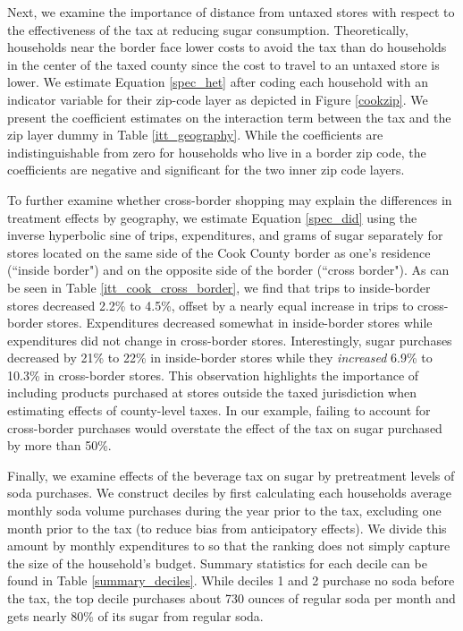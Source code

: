 \documentclass[12pt]{article}
\begin{document}
Next, we examine the importance of distance from untaxed stores with respect to the effectiveness of the tax at reducing sugar consumption. Theoretically, households near the border face lower costs to avoid the tax than do households in the center of the taxed county since the cost to travel to an untaxed store is lower. We estimate Equation \ref{spec_het} after coding each household with an indicator variable for their zip-code layer as depicted in Figure \ref{cookzip}. We present the coefficient estimates on the interaction term between the tax and the zip layer dummy in Table \ref{itt_geography}. While the coefficients are indistinguishable from zero for households who live in a border zip code, the coefficients are negative and significant for the two inner zip code layers.

To further examine whether cross-border shopping may explain the differences in treatment effects by geography, we estimate Equation \ref{spec_did} using the inverse hyperbolic sine of trips, expenditures, and grams of sugar separately for stores located on the same side of the Cook County border as one's residence (``inside border") and on the opposite side of the border (``cross border"). As can be seen in Table \ref{itt_cook_cross_border}, we find that trips to inside-border stores decreased 2.2\% to 4.5\%, offset by a nearly equal increase in trips to cross-border stores. Expenditures decreased somewhat in inside-border stores while expenditures did not change in cross-border stores. Interestingly, sugar purchases decreased by 21\% to 22\% in inside-border stores while they \textit{increased} 6.9\% to 10.3\% in cross-border stores. This observation highlights the importance of including products purchased at stores outside the taxed jurisdiction when estimating effects of county-level taxes. In our example, failing to account for cross-border purchases would overstate the effect of the tax on sugar purchased by more than 50\%.

Finally, we examine effects of the beverage tax on sugar by pretreatment levels of soda purchases. We construct deciles by first calculating each households average monthly soda volume purchases during the year prior to the tax, excluding one month prior to the tax (to reduce bias from anticipatory effects). We divide this amount by monthly expenditures to so that the ranking does not simply capture the size of the household's budget. Summary statistics for each decile can be found in Table \ref{summary_deciles}. While deciles 1 and 2 purchase no soda before the tax, the top decile purchases about 730 ounces of regular soda per month and gets nearly 80\% of its sugar from regular soda.
\end{document}
